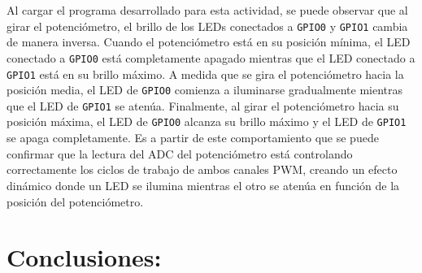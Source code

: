 \documentclass[letterpaper,12pt]{article}
\begin{document}
    Al cargar el programa desarrollado para esta actividad, se puede observar que al girar el potenciómetro, el brillo de los LEDs conectados a \texttt{GPIO0} y \texttt{GPIO1} cambia de manera inversa. Cuando el potenciómetro está en su posición mínima, el LED conectado a \texttt{GPIO0} está completamente apagado mientras que el LED conectado a \texttt{GPIO1} está en su brillo máximo. A medida que se gira el potenciómetro hacia la posición media, el LED de \texttt{GPIO0} comienza a iluminarse gradualmente mientras que el LED de \texttt{GPIO1} se atenúa. Finalmente, al girar el potenciómetro hacia su posición máxima, el LED de \texttt{GPIO0} alcanza su brillo máximo y el LED de \texttt{GPIO1} se apaga completamente. Es a partir de este comportamiento  que se puede confirmar que la lectura del ADC del potenciómetro está controlando correctamente los ciclos de trabajo de ambos canales PWM, creando un efecto dinámico donde un LED se ilumina mientras el otro se atenúa en función de la posición del potenciómetro.

    \newpage
    \section{Conclusiones:}
\end{document}
